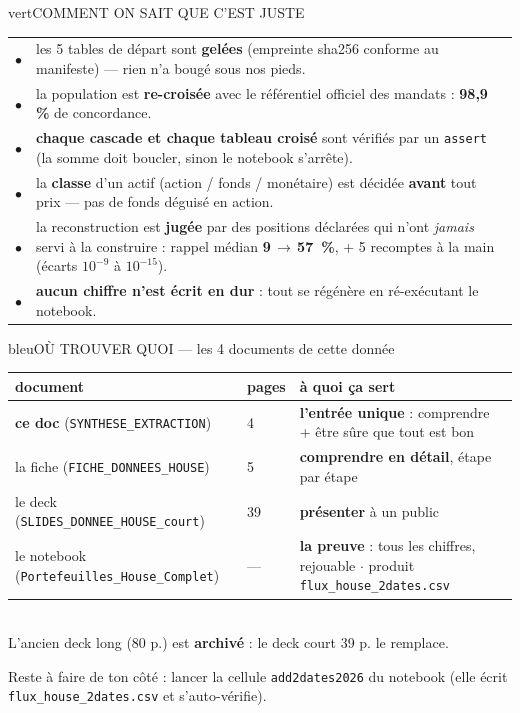 \documentclass[10pt,a4paper]{article}
\newcommand{\feu}[1]{\textcolor{#1}{\Large$\bullet$}}
\newcommand{\fv}{\feu{vert}}\newcommand{\fo}{\feu{orange}}\newcommand{\fr}{\feu{rouge}}
\begin{document}
\begin{bloc}{vert}{COMMENT ON SAIT QUE C'EST JUSTE}
\footnotesize
\begin{tabular}{@{}c p{15.6cm}@{}}
\fv & les 5 tables de départ sont \textbf{gelées} (empreinte sha256 conforme au manifeste) --- rien n'a bougé sous nos pieds.\\
\fv & la population est \textbf{re-croisée} avec le référentiel officiel des mandats : \textbf{98,9 \%} de concordance.\\
\fv & \textbf{chaque cascade et chaque tableau croisé} sont vérifiés par un \texttt{assert} (la somme doit boucler, sinon le notebook s'arrête).\\
\fv & la \textbf{classe} d'un actif (action / fonds / monétaire) est décidée \textbf{avant} tout prix --- pas de fonds déguisé en action.\\
\fv & la reconstruction est \textbf{jugée} par des positions déclarées qui n'ont \emph{jamais} servi à la construire : rappel médian \textbf{9\,$\rightarrow$\,57~\%}, + 5 recomptes à la main (écarts $10^{-9}$ à $10^{-15}$).\\
\fv & \textbf{aucun chiffre n'est écrit en dur} : tout se régénère en ré-exécutant le notebook.\\
\end{tabular}
\end{bloc}

\begin{bloc}{bleu}{OÙ TROUVER QUOI --- les 4 documents de cette donnée}
\footnotesize
\begin{tabular}{@{}l l l@{}}
\textbf{document} & \textbf{pages} & \textbf{à quoi ça sert}\\
\midrule
\textbf{ce doc} (\texttt{SYNTHESE\_EXTRACTION}) & 4 & \textbf{l'entrée unique} : comprendre + être sûre que tout est bon\\
la fiche (\texttt{FICHE\_DONNEES\_HOUSE}) & 5 & \textbf{comprendre en détail}, étape par étape\\
le deck (\texttt{SLIDES\_DONNEE\_HOUSE\_court}) & 39 & \textbf{présenter} à un public\\
le notebook (\texttt{Portefeuilles\_House\_Complet}) & --- & \textbf{la preuve} : tous les chiffres, rejouable $\cdot$ produit \texttt{flux\_house\_2dates.csv}\\
\end{tabular}\\[1.5mm]
{\scriptsize\color{grisf} L'ancien deck long (80 p.) est \textbf{archivé} : le deck court 39 p. le remplace.}
\end{bloc}

\vfill
\begin{center}{\scriptsize\color{grisf} Reste à faire de ton côté : lancer la cellule \texttt{add2dates2026} du notebook
(elle écrit \texttt{flux\_house\_2dates.csv} et s'auto-vérifie).}\end{center}
\end{document}
